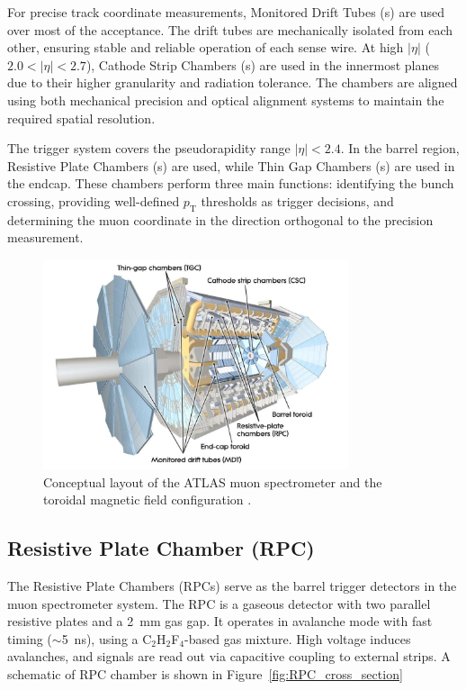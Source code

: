 For precise track coordinate measurements, Monitored Drift Tubes ({\MDT}s) are used over most of the acceptance. The drift tubes are mechanically isolated from each other, ensuring stable and reliable operation of each sense wire. At high $|\eta|$ ($2.0 < |\eta| < 2.7$), Cathode Strip Chambers ({\CSC}s) are used in the innermost planes due to their higher granularity and radiation tolerance. The chambers are aligned using both mechanical precision and optical alignment systems to maintain the required spatial resolution. 

The trigger system covers the pseudorapidity range $|\eta| < 2.4$. In the barrel region, Resistive Plate Chambers ({\RPC}s) are used, while Thin Gap Chambers ({\TGC}s) are used in the endcap. These chambers perform three main functions: identifying the bunch crossing, providing well-defined $p_\mathrm{T}$ thresholds as trigger decisions, and determining the muon coordinate in the direction orthogonal to the precision measurement.

\begin{figure}[htbp]
  \centering
  \includegraphics[width=0.8\textwidth]{figs/chapter2/muon_system.png}
  \caption{Conceptual layout of the ATLAS muon spectrometer and the toroidal magnetic field configuration \cite{ATLASDetector2008}.}
  \label{fig:muon_system}
\end{figure}

\subsection{Resistive Plate Chamber (RPC)}
The Resistive Plate Chambers (RPCs) serve as the barrel trigger detectors in the muon spectrometer system. The RPC is a gaseous detector with two parallel resistive plates and a 2~mm gas gap. It operates in avalanche mode with fast timing ($\sim$5~ns), using a C$_2$H$_2$F$_4$-based gas mixture. High voltage induces avalanches, and signals are read out via capacitive coupling to external strips. A schematic of RPC chamber is shown in Figure~\ref{fig:RPC_cross_section}

